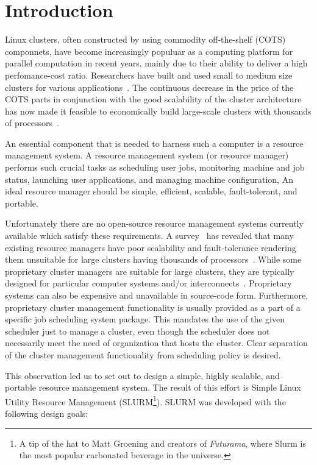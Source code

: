 \section{Introduction}
Linux clusters, often constructed by using commodity off-the-shelf (COTS) componnets,
have become increasingly populuar as a computing platform for parallel computation
in recent years, mainly due to their ability to deliver a high perfomance-cost ratio.
Researchers have built and used small to medium size clusters for various
applications~\cite{BeowulfWeb,LokiWeb}.
The continuous decrease in the price of the COTS parts in conjunction with
the good scalability of the cluster architecture has now made it feasible to economically
build large-scale clusters with thousands of processors~\cite{MCRWeb,PCRWeb}.

An essential component that is needed to harness such a computer is a 
resource management system.
A resource management system (or resource manager) performs such crucial tasks as
scheduling user jobs, monitoring machine and job status, launching user applications, and
managing machine configuration,
An ideal resource manager should be simple, efficient, scalable, fault-tolerant, 
and portable.

Unfortunately there are no open-source resource management systems currently available 
which satisfy these requirements.
A survey~\cite{Jette02} has revealed that many existing resource managers have poor scalability and fault-tolerance rendering them unsuitable for large clusters having 
thousands of processors~\cite{LoadLevelerWeb,LoadLevelerManual}.
While some proprietary cluster managers are suitable for large clusters, 
they are typically designed for particular computer systems and/or 
interconnects~\cite{RMS,LoadLevelerWeb,LoadLevelerManual}. 
Proprietary systems can also be expensive and unavailable in source-code form. 
Furthermore, proprietary cluster management functionality is usually provided as a 
part of a specific job scheduling system package. 
This mandates the use of the given scheduler just to manage a cluster, 
even though the scheduler does not necessarily meet the need of organization that hosts the cluster.
Clear separation of the cluster management functionality from scheduling policy is desired.

This observation led us to set out to design a simple, highly scalable, and 
portable resource management system. 
The result of this effort is Simple Linux Utility Resource Management 
(SLURM\footnote{A tip of the hat to Matt Groening and creators of {\em Futurama},
where Slurm is the most popular carbonated beverage in the universe.}). 
SLURM was developed with the following design goals:

